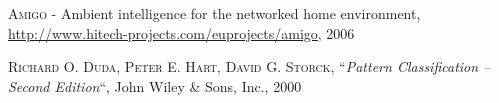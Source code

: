 
\begin{thebibliography}{123456789}

 \textsc{Amigo} - Ambient intelligence for the networked home environment,\\ \url{http://www.hitech-projects.com/euprojects/amigo}, 2006

 \textsc{Richard O. Duda, Peter E. Hart, David G. Storck}, ``\textit{Pattern Classification -- Second Edition}``, John Wiley \& Sons, Inc., 2000 %

\end{thebibliography}